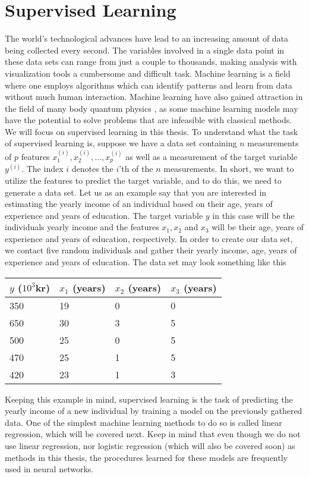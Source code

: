 \chapter{Supervised Learning}
\label{chap:SupervisedLearning}
The world's technological advances have lead to an increasing amount of data being collected every second. The variables involved in a single data point in these data sets can range from just a couple to thousands, making analysis with visualization tools a cumbersome and difficult task. Machine learning is a field where one employs algorithms which can identify patterns and learn from data without much human interaction. Machine learning have also gained attraction in the field of many body quantum physics \cite{MachineLearningQuantumPhysics}, as some machine learning models may have the potential to solve problems that are infeasible with classical methods.
We will focus on supervised learning in this thesis. To understand what the task of supervised learning is, suppose we have a data set containing $n$ measurements of $p$ features $x^{(i)}_1, x^{(i)}_2, ... , x^{(i)}_p$ as well as a measurement of the target variable $y^{(i)}$. The index $i$ denotes the $i$'th of the $n$ measurements. In short, we want to utilize the features to predict the target variable, and to do this, we need to generate a data set. Let us as an example say that you are interested in estimating the yearly income of an individual based on their age, years of experience and years of education. The target variable $y$ in this case will be the individuals yearly income and the features $x_1, x_2$ and $x_3$ will be their age, years of experience and years of education, respectively. In order to create our data set, we contact five random individuals and gather their yearly income, age, years of experience and years of education. The data set may look something like this
\begin{table}[H]
\centering
\begin{tabular}{|l|l|l|l|}
\hline
$y$ ($10^3$kr) & $x_1$ (years) & $x_2$ (years) & $x_3$ (years) \\ \hline
350            & 19            & 0             & 0             \\ \hline
650            & 30            & 3             & 5             \\ \hline
500            & 25            & 0             & 5             \\ \hline
470            & 25            & 1             & 5             \\ \hline
420            & 23            & 1             & 3   \\ \hline         
\end{tabular}
\end{table}
Keeping this example in mind, supervised learning is the task of predicting the yearly income of a new individual by training a model on the previously gathered data. One of the simplest machine learning methods to do so is called linear regression, which will be covered next.
Keep in mind that even though we do not use linear regression, nor logistic regression (which will also be covered soon) as methods in this thesis, the procedures learned for these models are frequently used in neural networks.

